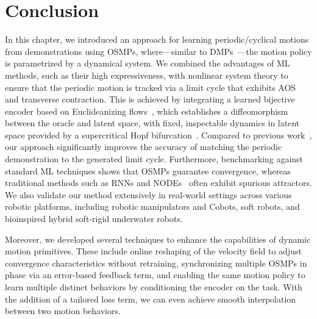 \section{Conclusion}\label{sec:osmp:conclusion}
In this chapter, we introduced an approach for learning periodic/cyclical motions from demonstrations using \glspl{OSMP}, where—similar to \glspl{DMP}~\citep{ijspeert2002learning, ijspeert2013dynamical}—the motion policy is parametrized by a dynamical system. We combined the advantages of \gls{ML} methods, such as their high expressiveness, with nonlinear system theory to ensure that the periodic motion is tracked via a limit cycle that exhibits \gls{AOS} and transverse contraction. This is achieved by integrating a learned bijective encoder based on Euclideanizing flows~\citep{dinh2016density, rana2020euclideanizing}, which establishes a diffeomorphism between the oracle and latent space, with fixed, inspectable dynamics in latent space provided by a supercritical Hopf bifurcation~\citep{strogatz2018nonlinear}. Compared to previous work~\citep{zhi2024teaching}, our approach significantly improves the accuracy of matching the periodic demonstration to the generated limit cycle. Furthermore, benchmarking against standard \gls{ML} techniques shows that \glspl{OSMP} guarantee convergence, whereas traditional methods such as \glspl{RNN} and \glspl{NODE}~\citep{zhi2024teaching} often exhibit spurious attractors. We also validate our method extensively in real-world settings across various robotic platforms, including robotic manipulators and \glspl{Cobot}, soft robots, and bioinspired hybrid soft-rigid underwater robots.

Moreover, we developed several techniques to enhance the capabilities of dynamic motion primitives. These include online reshaping of the velocity field to adjust convergence characteristics without retraining, synchronizing multiple \glspl{OSMP} in phase via an error-based feedback term, and enabling the same motion policy to learn multiple distinct behaviors by conditioning the encoder on the task. With the addition of a tailored loss term, we can even achieve smooth interpolation between two motion behaviors.

